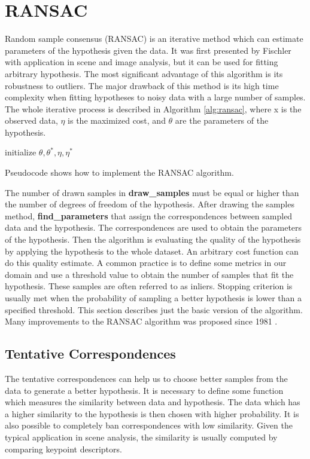 \section{RANSAC}
Random sample consensus (RANSAC) is an iterative method which can estimate parameters of the hypothesis given the data. It was first presented by Fischler \cite{fischler1981} with application in scene and image analysis, but it can be used for fitting arbitrary hypothesis. The most significant advantage of this algorithm is its robustness to outliers. The major drawback of this method is its high time complexity when fitting hypotheses to noisy data with a large number of samples. The whole iterative process is described in Algorithm \ref{alg:ransac}, where x is the observed data, $\eta$ is the maximized cost, and $\theta$ are the parameters of the hypothesis.
\begin{algorithm}[]
 initialize $\theta, \theta^*, \eta, \eta^*$\;
 \caption{Pseudocode shows how to implement the RANSAC algorithm.}
 \label{alg:ransac}
\end{algorithm}

The number of drawn samples in \textbf{draw\_samples} must be equal or higher than the number of degrees of freedom of the hypothesis. After drawing the samples method, \textbf{find\_parameters} that assign the correspondences between sampled data and the hypothesis. The correspondences are used to obtain the parameters of the hypothesis. Then the algorithm is evaluating the quality of the hypothesis by applying the hypothesis to the whole dataset. An arbitrary cost function can do this quality estimate. A common practice is to define some metrics in our domain and use a threshold value to obtain the number of samples that fit the hypothesis. These samples are often referred to as inliers. Stopping criterion is usually met when the probability of sampling a better hypothesis is lower than a specified threshold. This section describes just the basic version of the algorithm. Many improvements to the RANSAC algorithm was proposed since 1981 \cite{chum2008}.

\subsection{Tentative Correspondences}
The tentative correspondences can help us to choose better samples from the data to generate a better hypothesis. It is necessary to define some function which measures the similarity between data and hypothesis. The data which has a higher similarity to the hypothesis is then chosen with higher probability. It is also possible to completely ban correspondences with low similarity. Given the typical application in scene analysis, the similarity is usually computed by comparing keypoint descriptors.

